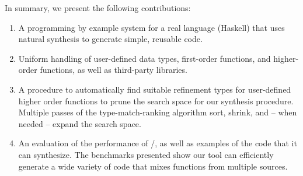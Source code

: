 In summary, we present the following contributions:

\begin{enumerate}[topsep=0pt]
\item A programming by example system for a real language (Haskell) that uses natural synthesis to generate simple, reusable code.
\item Uniform handling of user-defined data types, first-order functions, and higher-order functions, as well as third-party libraries.
\item A procedure to automatically find suitable refinement types for user-defined higher order functions to prune the search space for our synthesis procedure. Multiple passes of the type-match-ranking algorithm sort, shrink, and -- when needed -- expand the search space.
\item An evaluation of the performance of \ourTool/, as well as  examples of the code that it can synthesize. The benchmarks presented show our tool can efficiently generate a wide variety of code that mixes functions from multiple sources.
\end{enumerate}
